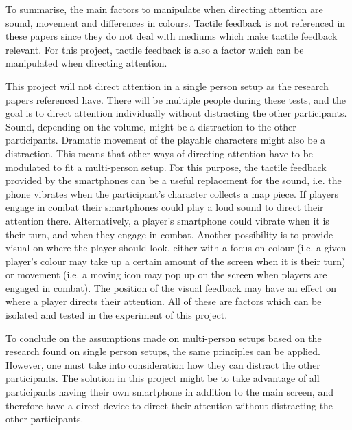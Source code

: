 To summarise, the main factors to manipulate when directing attention are sound, movement and differences in colours. Tactile feedback is not referenced in these papers since they do not deal with mediums which make tactile feedback relevant. For this project, tactile feedback is also a factor which can be manipulated when directing attention. 

This project will not direct attention in a single person setup as the research papers referenced have. There will be multiple people during these tests, and the goal is to direct attention individually without distracting the other participants. Sound, depending on the volume, might be a distraction to the other participants. Dramatic movement of the playable characters might also be a distraction. This means that other ways of directing attention have to be modulated to fit a multi-person setup. For this purpose, the tactile feedback provided by the smartphones can be a useful replacement for the sound, i.e. the phone vibrates when the participant's character collects a map piece. If players engage in combat their smartphones could play a loud sound to direct their attention there. Alternatively, a player's smartphone could vibrate when it is their turn, and when they engage in combat. Another possibility is to provide visual on where the player should look, either with a focus on colour (i.e. a given player's colour may take up a certain amount of the screen when it is their turn) or movement (i.e. a moving icon may pop up on the screen when players are engaged in combat). The position of the visual feedback may have an effect on where a player directs their attention. All of these are factors which can be isolated and tested in the experiment of this project.

To conclude on the assumptions made on multi-person setups based on the research found on single person setups, the same principles can be applied. However, one must take into consideration how they can distract the other participants. The solution in this project might be to take advantage of all participants having their own smartphone in addition to the main screen, and therefore have a direct device to direct their attention without distracting the other participants.

